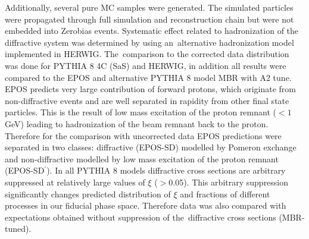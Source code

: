Additionally, several pure MC samples were generated. The simulated particles were propagated through full simulation and reconstruction chain but were  not embedded  into Zerobias events.   
Systematic effect related to hadronization of the diffractive system was determined by using an~alternative hadronization model implemented in HERWIG. The~comparison to the corrected data distribution was done for PYTHIA 8 4C (\ac{SaS}) and HERWIG, in addition all results were compared to the EPOS and alternative PYTHIA 8 model  \ac{MBR}  with A2 tune. EPOS predicts very large contribution of forward 
protons, which originate from non-diffractive events and are well separated in rapidity from other final state particles. This is the result of low mass excitation of the proton remnant ($<1$ GeV) leading to hadronization of the beam remnant back to the proton. Therefore for the comparison with uncorrected data EPOS predictions were separated in two classes: diffractive (EPOS-SD) modelled by Pomeron exchange and non-diffractive modelled  by low mass excitation of the proton remnant (EPOS-SD$^\prime$).
In all PYTHIA 8 models diffractive cross sections are arbitrary suppressed at 
relatively large values of $\xi$ ($>$0.05). This arbitrary suppression significantly changes predicted distribution of $\xi$ and fractions of different processes in our fiducial phase space. Therefore data was also compared with expectations obtained without suppression of the~diffractive cross sections (MBR-tuned).
